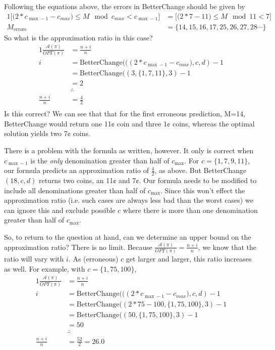 \documentclass[12pt]{amsart}
\begin{document}
Following the equations above, the errors in BetterChange should be given by\\
\begin{alignat*}{1}
\bigg[\big(2*c_{\max-1} -c_{max}\big) \leq M \mod c_{max} < c_{\max-1}\bigg]&=\bigg[\big(2*7 -11\big) \leq M \mod 11 < 7\bigg]\\
M_{\text{errors}}&=\{14,15,16,17,25,26,27,28\cdots\}
\end{alignat*}
So what is the approximation ratio in this case?
\begin{alignat*}{1}
\frac{\mathcal{A}(\pi)}{OPT(\pi)}&=\frac{n+i}{n}\\
i&=\text{BetterChange}\Big(((2*c_{\max-1} -c_{max}\big), c, d)-1\\
&=\text{BetterChange}\Big((3, \{1,7,11\}, 3)-1\\
&=2\\
&\therefore\\
\frac{n+i}{n}&=\frac{4}{2}\\
\end{alignat*}
Is this correct?  We can see that that for the first erroneous prediction, M=14, BetterChange would return one 11¢ coin and three 1¢ coins, whereas the optimal solution yields two 7¢ coins.\begin{footnote}{There is a problem with the formula as written, however.  It only is correct when $c_{\max-1}$ is the \textit{only} denomination greater than half of $c_{\max}$.  For $c=\{1,7,9,11\}$, our formula predicts an approximation ratio of $\frac{4}{2}$, as above.  But BetterChange$(18,c,d)$ returns two coins, an 11¢ and 7¢.  Our formula needs to be modified to include all denominations greater than half of $c_{\max}$.  Since this won't effect the approximation ratio (i.e. such cases are always less bad than the worst cases) we can ignore this and exclude possible $c$ where there is more than one denomination greater than half of $c_{\max}$.}\end{footnote}

So, to return to the question at hand, can we determine an upper bound on the approximation ratio?  There is no limit.  Because $\frac{\mathcal{A}(\pi)}{OPT(\pi)}=\frac{n+i}{n}$, we know that the ratio will vary with $i$.  As (erroneous) $c$ get larger and larger, this ratio increases as well.  For example, with $c=\{1,75,100\}$,
\begin{alignat*}{1}
\frac{\mathcal{A}(\pi)}{OPT(\pi)}&=\frac{n+i}{n}\\
i&=\text{BetterChange}\Big(((2*c_{\max-1} -c_{max}\big), c, d)-1\\
&=\text{BetterChange}\Big((2*75 -100, \{1,75,100\}, 3)-1\\
&=\text{BetterChange}\Big((50, \{1,75,100\}, 3)-1\\
&=50\\
&\therefore\\
\frac{n+i}{n}&=\frac{52}{2}=26.0\\
\end{alignat*}
 
\end{document}
